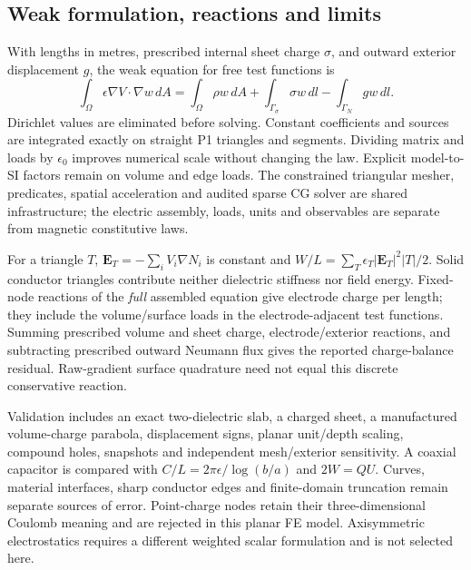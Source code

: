 \subsection{Weak formulation, reactions and limits}
\label{sec:electric-fe-methods}
With lengths in metres, prescribed internal sheet charge $\sigma$, and outward
exterior displacement $g$, the weak equation for free test functions is
\[
 \int_\Omega\epsilon\nabla V\cdot\nabla w\,dA
 =\int_\Omega\rho w\,dA+\int_{\Gamma_\sigma}\sigma w\,dl
   -\int_{\Gamma_N}g w\,dl.
\]
Dirichlet values are eliminated before solving. Constant coefficients and
sources are integrated exactly on straight P1 triangles and segments.
Dividing matrix and loads by $\epsilon_0$ improves numerical scale without
changing the law. Explicit model-to-SI factors remain on volume and edge loads.
The constrained triangular mesher, predicates, spatial acceleration and audited
sparse CG solver are shared infrastructure; the electric assembly, loads,
units and observables are separate from magnetic constitutive laws.

For a triangle $T$, $\mathbf E_T=-\sum_i V_i\nabla N_i$ is constant and
$W/L=\sum_T\epsilon_T|\mathbf E_T|^2|T|/2$. Solid conductor triangles contribute
neither dielectric stiffness nor field energy. Fixed-node reactions of the
\emph{full} assembled equation give electrode charge per length; they include
the volume/surface loads in the electrode-adjacent test functions. Summing
prescribed volume and sheet charge, electrode/exterior reactions, and subtracting
prescribed outward Neumann flux gives the reported charge-balance residual.
Raw-gradient surface quadrature need not equal this discrete conservative reaction.

Validation includes an exact two-dielectric slab, a charged sheet, a manufactured
volume-charge parabola, displacement signs, planar unit/depth scaling, compound
holes, snapshots and independent mesh/exterior sensitivity. A coaxial capacitor
is compared with $C/L=2\pi\epsilon/\log(b/a)$ and $2W=QU$. Curves, material
interfaces, sharp conductor edges and finite-domain truncation remain separate
sources of error. Point-charge nodes retain their three-dimensional Coulomb
meaning and are rejected in this planar FE model. Axisymmetric electrostatics
requires a different weighted scalar formulation and is not selected here.
